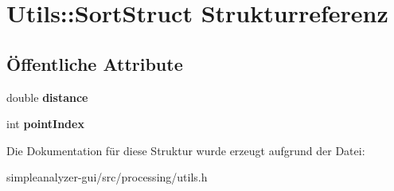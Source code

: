 \hypertarget{structUtils_1_1SortStruct}{\section{Utils\-:\-:Sort\-Struct Strukturreferenz}
\label{structUtils_1_1SortStruct}
}
\subsection*{Öffentliche Attribute}
\begin{DoxyCompactItemize}
\item 
\hypertarget{structUtils_1_1SortStruct_aca911abd52b034a588bab7b414cf93cb}{double {\bfseries distance}}\label{structUtils_1_1SortStruct_aca911abd52b034a588bab7b414cf93cb}

\item 
\hypertarget{structUtils_1_1SortStruct_ad470a3f9a230e66a47fd022bf7a4a70e}{int {\bfseries point\-Index}}\label{structUtils_1_1SortStruct_ad470a3f9a230e66a47fd022bf7a4a70e}

\end{DoxyCompactItemize}


Die Dokumentation für diese Struktur wurde erzeugt aufgrund der Datei\-:\begin{DoxyCompactItemize}
\item 
simpleanalyzer-\/gui/src/processing/utils.\-h\end{DoxyCompactItemize}
